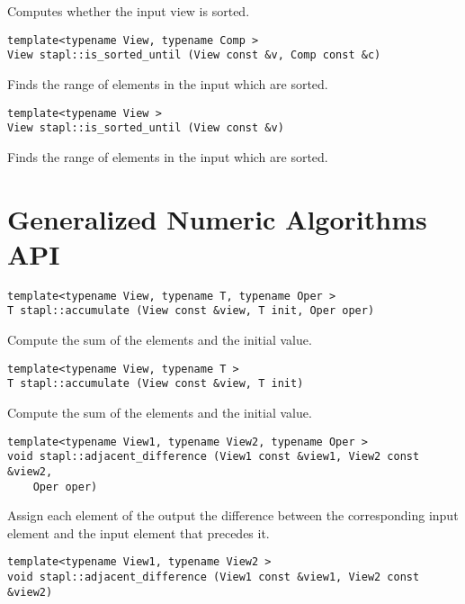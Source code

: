 Computes whether the input view is sorted.

\begin{verbatim}
template<typename View, typename Comp >
View stapl::is_sorted_until (View const &v, Comp const &c)
\end{verbatim}

Finds the range of elements in the input which are sorted.

\begin{verbatim}
template<typename View >
View stapl::is_sorted_until (View const &v)
\end{verbatim}

Finds the range of elements in the input which are sorted.


\pagebreak

\section{Generalized Numeric Algorithms API} \label{sec-numer-alg}

\begin{verbatim}
template<typename View, typename T, typename Oper >
T stapl::accumulate (View const &view, T init, Oper oper)
\end{verbatim}

Compute the sum of the elements and the initial value.

\begin{verbatim}
template<typename View, typename T >
T stapl::accumulate (View const &view, T init)
\end{verbatim}

Compute the sum of the elements and the initial value.

\begin{verbatim}
template<typename View1, typename View2, typename Oper >
void stapl::adjacent_difference (View1 const &view1, View2 const &view2,
    Oper oper)
\end{verbatim}

Assign each element of the output the difference between the corresponding input element and the input element that precedes it.

\begin{verbatim}
template<typename View1, typename View2 >
void stapl::adjacent_difference (View1 const &view1, View2 const &view2)
\end{verbatim}

